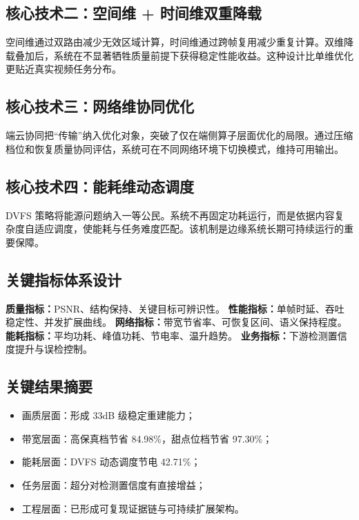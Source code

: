 \documentclass[12pt,a4paper]{ctexart}
\begin{document}
\subsection{核心技术二：空间维 + 时间维双重降载}

空间维通过双路由减少无效区域计算，时间维通过跨帧复用减少重复计算。双维降载叠加后，系统在不显著牺牲质量前提下获得稳定性能收益。这种设计比单维优化更贴近真实视频任务分布。

\subsection{核心技术三：网络维协同优化}

端云协同把“传输”纳入优化对象，突破了仅在端侧算子层面优化的局限。通过压缩档位和恢复质量协同评估，系统可在不同网络环境下切换模式，维持可用输出。

\subsection{核心技术四：能耗维动态调度}

DVFS 策略将能源问题纳入一等公民。系统不再固定功耗运行，而是依据内容复杂度自适应调度，使能耗与任务难度匹配。该机制是边缘系统长期可持续运行的重要保障。

\subsection{关键指标体系设计}

\textbf{质量指标：}PSNR、结构保持、关键目标可辨识性。\newline
\textbf{性能指标：}单帧时延、吞吐稳定性、并发扩展曲线。\newline
\textbf{网络指标：}带宽节省率、可恢复区间、语义保持程度。\newline
\textbf{能耗指标：}平均功耗、峰值功耗、节电率、温升趋势。\newline
\textbf{业务指标：}下游检测置信度提升与误检控制。

\subsection{关键结果摘要}

\begin{itemize}
  \item 画质层面：形成 33dB 级稳定重建能力；
  \item 带宽层面：高保真档节省 84.98\%，甜点位档节省 97.30\%；
  \item 能耗层面：DVFS 动态调度节电 42.71\%；
  \item 任务层面：超分对检测置信度有直接增益；
  \item 工程层面：已形成可复现证据链与可持续扩展架构。
\end{itemize}
\end{document}
